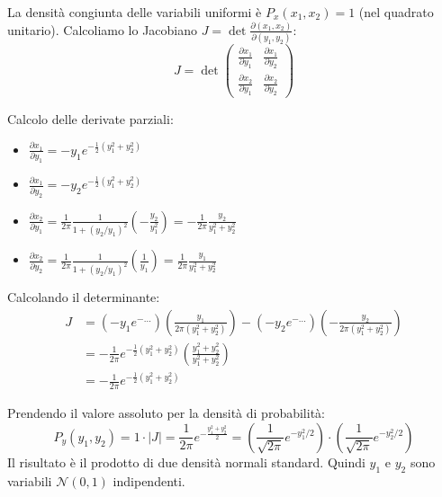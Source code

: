 \documentclass[openany,a4paper,12pt]{book}
\theoremstyle{remark}
\begin{document}
La densità congiunta delle variabili uniformi è $P_x(x_1, x_2) = 1$ (nel quadrato unitario).
Calcoliamo lo Jacobiano $J = \det \frac{\partial(x_1, x_2)}{\partial(y_1, y_2)}$:
\[
J = \det \begin{pmatrix}
\frac{\partial x_1}{\partial y_1} & \frac{\partial x_1}{\partial y_2} \\
\frac{\partial x_2}{\partial y_1} & \frac{\partial x_2}{\partial y_2}
\end{pmatrix}
\]

Calcolo delle derivate parziali:
\begin{itemize}
    \item $\frac{\partial x_1}{\partial y_1} = -y_1 e^{-\frac{1}{2}(y_1^2+y_2^2)}$
    \item $\frac{\partial x_1}{\partial y_2} = -y_2 e^{-\frac{1}{2}(y_1^2+y_2^2)}$
    \item $\frac{\partial x_2}{\partial y_1} = \frac{1}{2\pi} \frac{1}{1+(y_2/y_1)^2} \left(-\frac{y_2}{y_1^2}\right) = -\frac{1}{2\pi} \frac{y_2}{y_1^2+y_2^2}$
    \item $\frac{\partial x_2}{\partial y_2} = \frac{1}{2\pi} \frac{1}{1+(y_2/y_1)^2} \left(\frac{1}{y_1}\right) = \frac{1}{2\pi} \frac{y_1}{y_1^2+y_2^2}$
\end{itemize}

Calcolando il determinante:
\begin{align*}
J &= \left(-y_1 e^{-\dots}\right)\left(\frac{y_1}{2\pi(y_1^2+y_2^2)}\right) - \left(-y_2 e^{-\dots}\right)\left(-\frac{y_2}{2\pi(y_1^2+y_2^2)}\right) \\
&= -\frac{1}{2\pi} e^{-\frac{1}{2}(y_1^2+y_2^2)} \left( \frac{y_1^2 + y_2^2}{y_1^2 + y_2^2} \right) \\
&= -\frac{1}{2\pi} e^{-\frac{1}{2}(y_1^2+y_2^2)}
\end{align*}

Prendendo il valore assoluto per la densità di probabilità:
\begin{equation}
P_y(y_1, y_2) = 1 \cdot |J| = \frac{1}{2\pi} e^{-\frac{y_1^2 + y_2^2}{2}} = \left(\frac{1}{\sqrt{2\pi}}e^{-y_1^2/2}\right) \cdot \left(\frac{1}{\sqrt{2\pi}}e^{-y_2^2/2}\right)
\end{equation}
Il risultato è il prodotto di due densità normali standard. Quindi $y_1$ e $y_2$ sono variabili $\mathcal{N}(0,1)$ indipendenti.
\end{document}
